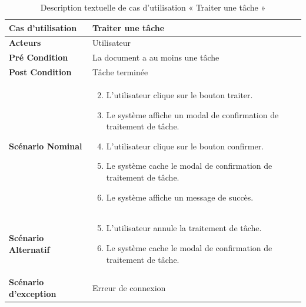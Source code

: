 \begin{longtable}{|p{5cm}|p{10cm}|}
  \caption{Description textuelle de cas d'utilisation « Traiter une tâche »} \label{tab:DescriptionTextuelleDeCasDUtilisationTraiterUneTache} \\
\hline
\textbf{Cas d'utilisation}&Traiter une tâche\\
\hline
\textbf{Acteurs}&Utilisateur\\
\hline
\textbf{Pré Condition}&La document a au moins une tâche\\
\hline
\textbf{Post Condition}&Tâche terminée\\
\hline
\textbf{Scénario Nominal}&
\vspace{-\baselineskip}
\begin{enumerate}
    \setcounter{enumi}{1}
    \item L'utilisateur clique sur le bouton traiter.
    \item Le système affiche un modal de confirmation de traitement de tâche.
    \item L'utilisateur clique sur le bouton confirmer.
    \item Le système cache le modal de confirmation de traitement de tâche.
    \item Le système affiche un message de succès.
\end{enumerate}\\
\hline
\textbf{Scénario Alternatif}&
\vspace{-\baselineskip}
\begin{enumerate}
    \setcounter{enumi}{4}
    \item L'utilisateur annule la traitement de tâche.
    \item Le système cache le modal de confirmation de traitement de tâche.
\end{enumerate}\\
\hline
\textbf{Scénario d'exception}&Erreur de connexion\\
\hline

\end{longtable}




